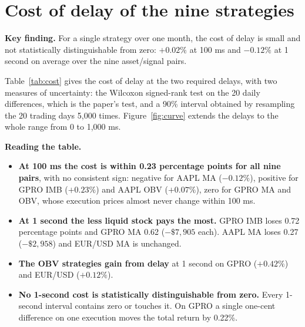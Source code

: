 \documentclass[11pt]{article}
\newcommand{\keyfinding}[1]{%
  \begingroup\setlength{\fboxsep}{9pt}%
  \noindent\colorbox{boxbg}{\parbox{\dimexpr\linewidth-2\fboxsep\relax}{\textbf{\color{accent}Key finding.} #1}}%
  \endgroup\par\vspace{0.5em}}
\begin{document}
\section{Cost of delay of the nine strategies}
\label{sec:cost}

\keyfinding{For a single strategy over one month, the cost of delay is small and
not statistically distinguishable from zero: $+0.02\%$ at 100 ms and $-0.12\%$ at
1 second on average over the nine asset/signal pairs.}

Table~\ref{tab:cost} gives the cost of delay at the two required delays, with two
measures of uncertainty: the Wilcoxon signed-rank test on the 20 daily differences,
which is the paper's test, and a 90\% interval obtained by resampling the 20
trading days 5{,}000 times. Figure~\ref{fig:curve} extends the delays to the whole
range from 0 to 1{,}000 ms.

\begin{table}[H]
  \centering
  \small
  \setlength{\tabcolsep}{5pt}
  \caption{Cost of delay of the nine strategies: total return with the delay minus
  total return at 0 ms, in percentage points. The Wilcoxon test is not reported
  when fewer than six days differ.}
  \label{tab:cost}
  
\end{table}

\textbf{Reading the table.}

\begin{itemize}
  \item \textbf{At 100 ms the cost is within 0.23 percentage points for all nine
        pairs}, with no consistent sign: negative for AAPL MA ($-0.12\%$), positive
        for GPRO IMB ($+0.23\%$) and AAPL OBV ($+0.07\%$), zero for GPRO MA and
        OBV, whose execution prices almost never change within 100 ms.
  \item \textbf{At 1 second the less liquid stock pays the most.} GPRO IMB loses
        0.72 percentage points and GPRO MA 0.62 ($-\$7{,}905$ each). AAPL MA loses
        0.27 ($-\$2{,}958$) and EUR/USD MA is unchanged.
  \item \textbf{The OBV strategies gain from delay} at 1 second on GPRO
        ($+0.42\%$) and EUR/USD ($+0.12\%$).
  \item \textbf{No 1-second cost is statistically distinguishable from zero.}
        Every 1-second interval contains zero or touches it. On GPRO a single
        one-cent difference on one execution moves the total return by 0.22\%.
\end{itemize}
\end{document}
